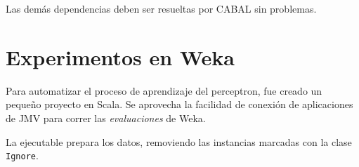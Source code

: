 \documentclass{article}
\begin{document}
Las demás dependencias deben ser resueltas por CABAL sin problemas.

\section{Experimentos en Weka}

Para automatizar el proceso de aprendizaje del perceptron, fue creado un pequeño proyecto en Scala. Se aprovecha la facilidad de conexión de aplicaciones de JMV para correr las \emph{evaluaciones} de Weka.

La ejecutable prepara los datos, removiendo las instancias marcadas con la clase \verb|Ignore|.
\end{document}

